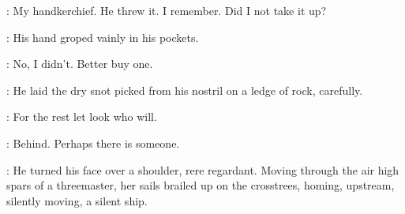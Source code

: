 \StephenInt:
My handkerchief.
He threw it.
I remember.
Did I not take it up?

:
His hand groped vainly in his pockets.

\StephenInt:
No, I didn't.
Better buy one.

:
He laid the dry snot picked from his nostril on a ledge of rock,
carefully.

\StephenInt:
For the rest let look who will.

\StephenInt:
Behind.
Perhaps there is someone.

:
He turned his face over a shoulder, rere regardant.
Moving through the air high spars of a threemaster,
her sails brailed up on the crosstrees,
homing, upstream, silently moving,
a silent ship.


